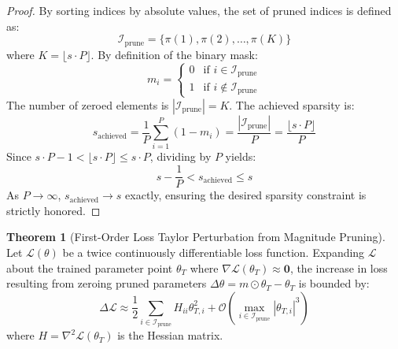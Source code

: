 \documentclass[11pt,a4paper]{article}
\theoremstyle{definition}
\newtheorem{theorem}{\textbf{Theorem}}[section]
\begin{document}
\begin{proof}
By sorting indices by absolute values, the set of pruned indices is defined as:
\begin{equation}
\mathcal{I}_{\text{prune}} = \{ \pi(1), \pi(2), \dots, \pi(K) \}
\end{equation}
where $K = \lfloor s \cdot P \rfloor$.
By definition of the binary mask:
\begin{equation}
m_i = \begin{cases} 0 & \text{if } i \in \mathcal{I}_{\text{prune}} \\ 1 & \text{if } i \notin \mathcal{I}_{\text{prune}} \end{cases}
\end{equation}
The number of zeroed elements is $|\mathcal{I}_{\text{prune}}| = K$.
The achieved sparsity is:
\begin{equation}
s_{\text{achieved}} = \frac{1}{P} \sum_{i=1}^P (1 - m_i) = \frac{|\mathcal{I}_{\text{prune}}|}{P} = \frac{\lfloor s \cdot P \rfloor}{P}
\end{equation}
Since $s \cdot P - 1 < \lfloor s \cdot P \rfloor \le s \cdot P$, dividing by $P$ yields:
\begin{equation}
s - \frac{1}{P} < s_{\text{achieved}} \le s
\end{equation}
As $P \to \infty$, $s_{\text{achieved}} \to s$ exactly, ensuring the desired sparsity constraint is strictly honored.
\end{proof}

\begin{theorem}[First-Order Loss Taylor Perturbation from Magnitude Pruning]
Let $\mathcal{L}(\theta)$ be a twice continuously differentiable loss function. Expanding $\mathcal{L}$ about the trained parameter point $\theta_T$ where $\nabla \mathcal{L}(\theta_T) \approx \mathbf{0}$, the increase in loss resulting from zeroing pruned parameters $\Delta \theta = m \odot \theta_T - \theta_T$ is bounded by:
{\boldmath
\begin{equation}
\Delta \mathcal{L} \approx \frac{1}{2} \sum_{i \in \mathcal{I}_{\text{prune}}} H_{ii} \theta_{T, i}^2 + \mathcal{O}\left( \max_{i \in \mathcal{I}_{\text{prune}}} |\theta_{T, i}|^3 \right)
\end{equation}
}
where $H = \nabla^2 \mathcal{L}(\theta_T)$ is the Hessian matrix.
\end{theorem}
\end{document}
